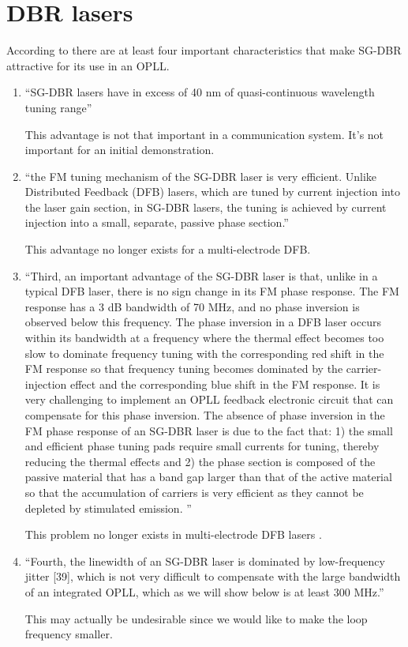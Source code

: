 \documentclass[a4paper]{article}
\begin{document}
\section{DBR lasers}

According to \cite[Section III]{Ristic2010} there are at least four important characteristics that make SG-DBR attractive for its use in an OPLL.

\begin{enumerate}
	\item ``SG-DBR lasers have in excess of 40 nm of quasi-continuous wavelength tuning range''
	
	This advantage is not that important in a communication system. It's not important for an initial demonstration. 
	
	\item ``the FM tuning mechanism of the SG-DBR laser is very efficient. Unlike Distributed Feedback (DFB) lasers, which are tuned by current injection into the laser gain section, in SG-DBR lasers, the tuning is achieved by current injection into a small, separate, passive phase section.''
	
	This advantage no longer exists for a multi-electrode DFB.
	
	\item ``Third, an important advantage of the SG-DBR laser is that, unlike in a typical DFB laser, there is no sign change in its FM phase response. The FM response has a 3 dB bandwidth of 70 MHz, and no phase inversion is observed below this frequency. The phase inversion in a DFB laser occurs within its bandwidth at a frequency where the thermal effect becomes too slow to dominate frequency tuning with the corresponding red shift in the FM response so that frequency tuning becomes dominated by the carrier-injection effect and the corresponding blue shift in the FM response. It is very challenging to implement an OPLL feedback electronic circuit that can compensate for this phase inversion. The absence of phase inversion in the FM phase response of an SG-DBR laser is due to the fact that: 1) the small and efficient phase tuning pads require small currents for tuning, thereby reducing the thermal effects and 2) the phase section is composed of the passive material that has a band gap larger than that of the active material so that the accumulation of carriers is very efficient as they cannot be depleted by stimulated emission. ''
	
	This problem no longer exists in multi-electrode DFB lasers \cite{Jacquet1993}.
	
	\item ``Fourth, the linewidth of an SG-DBR laser is dominated by low-frequency jitter [39], which is not very difficult to compensate with the large bandwidth of an integrated OPLL, which as we will show below is at least 300 MHz.'' 
	
	This may actually be undesirable since we would like to make the loop frequency smaller.
	
\end{enumerate}
\end{document}
